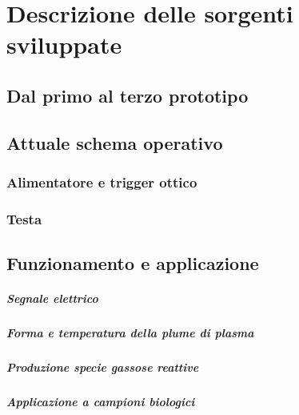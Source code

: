 \chapter{Descrizione delle sorgenti sviluppate}

\section{Dal primo al terzo prototipo}

\section{Attuale schema operativo}
\subsection{Alimentatore e trigger ottico}
\subsection{Testa}

\section{Funzionamento e applicazione}
\paragraph{Segnale elettrico}
\paragraph{Forma e temperatura della \emph{plume} di plasma}
\paragraph{Produzione specie gassose reattive}
\paragraph{Applicazione a campioni biologici}


\label{ch:sorgentemisure}
